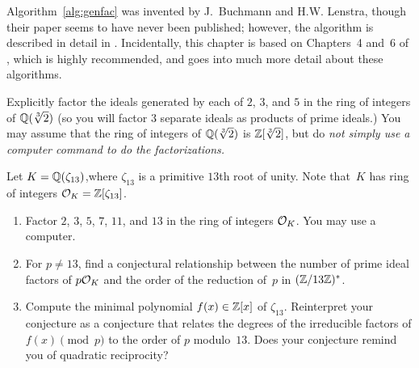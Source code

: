 Algorithm~\ref{alg:genfac} was invented by J.~Buchmann and
H.\thinspace{}W. Lenstra, though their paper seems to have never been
published; however, the algorithm is described in detail in
\cite[\S6.2.5]{cohen:course_ant}.  Incidentally, this chapter is based
on Chapters~4 and~6 of \cite{cohen:course_ant}, which is highly
recommended, and goes into much more detail about these algorithms.

\begin{exercise}
	Explicitly factor the ideals generated by each of $2$, $3$, and $5$ in
	the ring of integers of $\mathbb{Q}(\sqrt[3]{2})$ (so you will factor $3$
	separate ideals as products of prime ideals.)
	You may assume that the ring of integers of $\mathbb{Q}(\sqrt[3]{2})$
	is $\mathbb{Z}[\sqrt[3]{2}]$, but do \em{not} simply use a computer command to do
	the factorizations.
\end{exercise}

\begin{exercise}
	Let $K=\mathbb{Q}(\zeta_{13})$,where $\zeta_{13}$ is a primitive $13$th root of
	unity. Note that~$K$ has ring of integers $\mathcal{O}_K=\mathbb{Z}[\zeta_{13}]$.
	\begin{enumerate}
		\item Factor $2$, $3$, $5$, $7$, $11$, and $13$ in the ring
		of integers $\mathcal{O}_K$.  You may use a computer.
		\item For $p\neq 13$, find a conjectural
		relationship between the number of prime ideal factors of $p\mathcal{O}_K$
		and the order of the reduction of~$p$  in $(\mathbb{Z}/13\mathbb{Z})^*$.
		\item Compute the minimal polynomial $f(x)\in\mathbb{Z}[x]$ of $\zeta_{13}$.
		Reinterpret your conjecture as a conjecture that
		relates the degrees of the irreducible factors of $f(x)\pmod{p}$ to
		the order of $p$ modulo~$13$. Does your conjecture
		remind you of quadratic reciprocity?
	\end{enumerate}
\end{exercise}




